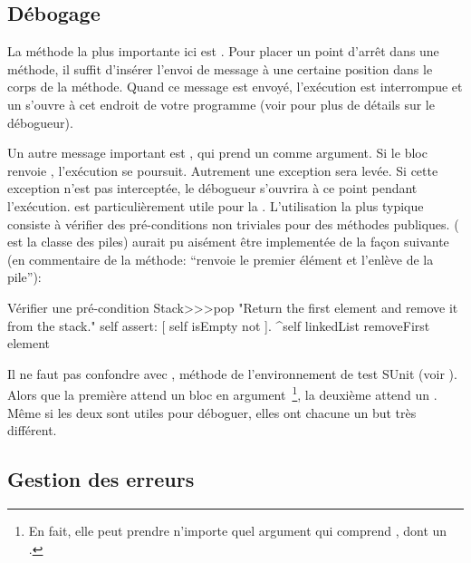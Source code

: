 \documentclass[a4paper,10pt,twoside]{book}
\begin{document}
\subsection{D\'ebogage}

La m\'ethode la plus importante ici est . Pour
placer un point d'arr\^et dans une m\'ethode, il suffit d'ins\'erer
l'envoi de message  \`a une certaine position dans le
corps de la m\'ethode.  Quand ce message est envoy\'e, l'ex\'ecution
est interrompue et un  s'ouvre \`a cet endroit de votre programme
(voir  pour plus de d\'etails sur le d\'ebogueur).


Un autre message important est , qui prend un
 comme argument. Si le bloc renvoie , l'ex\'ecution
se poursuit. Autrement une exception sera lev\'ee. Si  cette exception
n'est pas intercept\'ee, le d\'ebogueur s'ouvrira \`a ce point pendant
l'ex\'ecution.  est particuli\`erement utile pour la
. L'utilisation la plus typique
consiste \`a v\'erifier des pr\'e-conditions non triviales pour des
m\'ethodes publiques.  
( est la classe des piles)
aurait pu ais\'ement \^etre implement\'ee de la fa\c{c}on suivante
(en commentaire de la m\'ethode: ``renvoie le premier \'el\'ement et
l'enl\`eve de la pile''):

\begin{method}{V\'erifier une pr\'e-condition}
Stack>>>pop
    "Return the first element and remove it from the stack."
    self assert: [ self isEmpty not ].
    ^self linkedList removeFirst element
\end{method}

Il ne faut pas confondre  avec , m\'ethode de l'environnement de test SUnit (voir ). Alors que la premi\`ere attend un bloc en argument~\footnote{En fait, elle peut prendre n'importe quel argument qui comprend , dont un .}, la deuxi\`eme attend un . M\^eme si les deux sont utiles pour d\'eboguer, elles ont chacune un but tr\`es diff\'erent.

\subsection{Gestion des erreurs}
\end{document}
